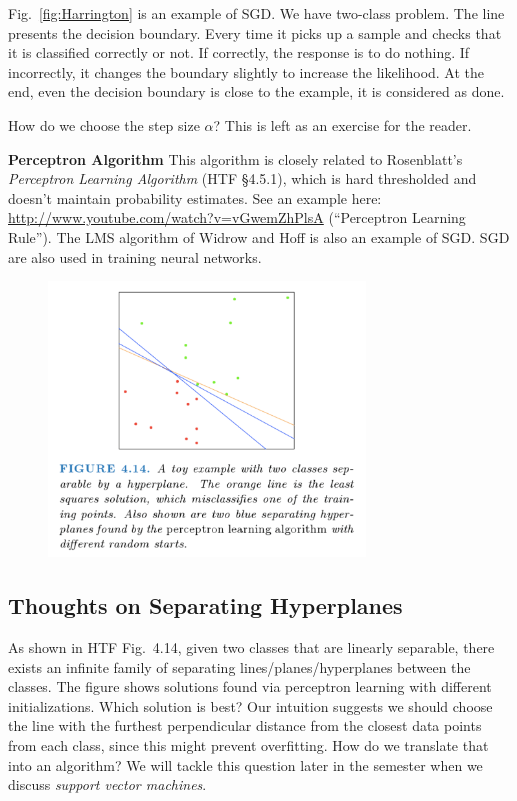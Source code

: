 \documentclass[a4paper]{article}
\begin{document}
Fig.\ \ref{fig:Harrington} is an example of SGD. We have two-class problem. The line presents the decision boundary. Every time it picks up a sample and checks that it is classified correctly or not. If correctly, the response is to do nothing. If incorrectly, it changes the boundary slightly to increase the likelihood. At the end, even the decision boundary is close to the example, it is considered as done.     

How do we choose the step size $\alpha$?  This is left as an exercise for the reader. 

\textbf{Perceptron Algorithm }
This algorithm is closely related to Rosenblatt's \emph{Perceptron Learning Algorithm} (HTF \S4.5.1), which is hard thresholded and doesn't maintain probability estimates.  See an example here: \url{http://www.youtube.com/watch?v=vGwemZhPlsA} (``Perceptron Learning Rule'').  The LMS algorithm of Widrow and Hoff is also an example of SGD. SGD are also used in training neural networks.


\begin{figure}
\centering
\includegraphics[width=0.75\textwidth]{sep_hyperplane}
\label{fig:sep_hyperplane}
\end{figure}

\subsection{Thoughts on Separating Hyperplanes}
As shown in HTF Fig.\ 4.14, given two classes that are linearly separable, there exists an infinite family of separating lines/planes/hyperplanes between the classes.  The figure shows solutions found via perceptron learning with different initializations.  Which solution is best?  Our intuition suggests we should choose the line with the furthest  perpendicular distance from the closest data points from each class, since this might prevent overfitting. How do we translate that into an algorithm?  We will tackle this question later in the semester when we discuss \emph{support vector machines}.
\end{document}
